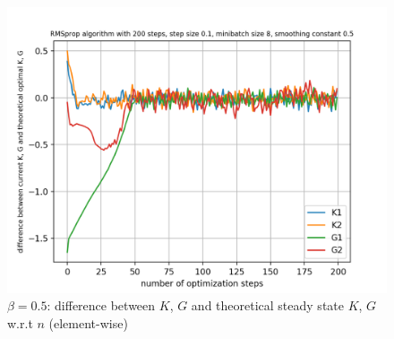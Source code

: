 \documentclass{article}
\begin{document}
\begin{figure}[h!]
\begin{minipage}[t]{.28\paperwidth}
		\includegraphics[width=1.0\textwidth]{Figures/d_beta_0_5_sep.png}
		\caption{$\beta = 0.5$: difference between $K$, $G$ and theoretical steady state $K$, $G$ w.r.t $n$ (element-wise)}
	\end{minipage}
\end{figure}
\end{document}
